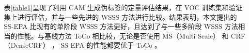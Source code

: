 
表\ref{table1}呈现了利用 CAM 生成伪标签的定量评估结果，在 VOC 训练集和验证集上进行评估，并与一些先进的 WSSS 方法进行比较。结果表明，本文提出的 SS-EPA 比现有的单阶段 WSSS 方法更好，且达到了与一些多阶段 WSSS 方法相当的性能。与基线方法 ToCo 相比较，无论是否使用 MS（Multi Scale） 和 CRF（DenseCRF） ， SS-EPA 的性能都要优于 ToCo 。

